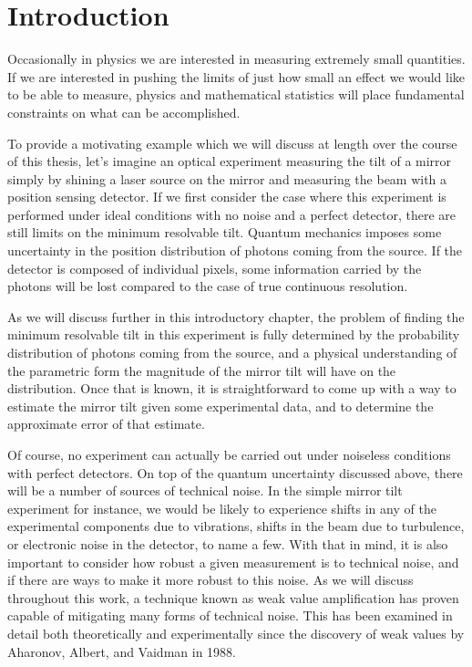 \chapter{Introduction}
\pagestyle{fancy}
Occasionally in physics we are interested in measuring extremely small quantities.  If we are interested in pushing the limits of just how small an effect we would like to be able to measure, physics and mathematical statistics will place fundamental constraints on what can be accomplished.

To provide a motivating example which we will discuss at length over the course of this thesis, let's imagine an optical experiment measuring the tilt of a mirror simply by shining a laser source on the mirror and measuring the beam with a position sensing detector.  If we first consider the case where this experiment is performed under ideal conditions with no noise and a perfect detector, there are still limits on the minimum resolvable tilt.  Quantum mechanics imposes some uncertainty in the position distribution of photons coming from the source.  If the detector is composed of individual pixels, some information carried by the photons will be lost compared to the case of true continuous resolution.

As we will discuss further in this introductory chapter, the problem of finding the minimum resolvable tilt in this experiment is fully determined by the probability distribution of photons coming from the source, and a physical understanding of the parametric form the magnitude of the mirror tilt will have on the distribution.  Once that is known, it is straightforward to come up with a way to estimate the mirror tilt given some experimental data, and to determine the approximate error of that estimate.

Of course, no experiment can actually be carried out under noiseless conditions with perfect detectors.  On top of the quantum uncertainty discussed above, there will be a number of sources of technical noise.  In the simple mirror tilt experiment for instance, we would be likely to experience shifts in any of the experimental components due to vibrations, shifts in the beam due to turbulence, or electronic noise in the detector, to name a few.  With that in mind, it is also important to consider how robust a given measurement is to technical noise, and if there are ways to make it more robust to this noise.  As we will discuss throughout this work, a technique known as weak value amplification has proven capable of mitigating many forms of technical noise.  This has been examined in detail both theoretically and experimentally since the discovery of weak values by Aharonov, Albert, and Vaidman in 1988.

